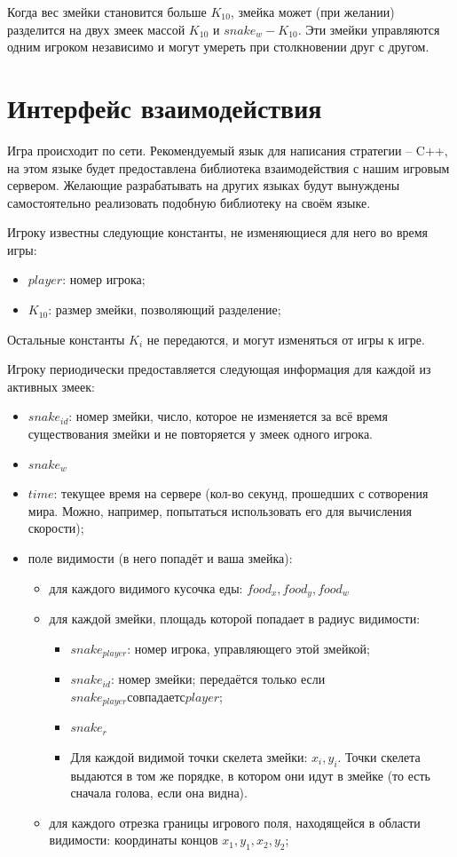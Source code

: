 \documentclass[12pt, a4paper]{article}
\begin{document}
Когда вес змейки становится больше $K_{10}$, змейка может (при желании) разделится на двух змеек массой $K_{10}$ и $snake_w - K_{10}$. Эти змейки управляются одним игроком независимо и могут умереть при столкновении друг с другом.

{\section{Интерфейс взаимодействия}}

Игра происходит по сети. Рекомендуемый язык для написания стратегии -- C++, на этом языке будет предоставлена библиотека взаимодействия с нашим игровым сервером. Желающие разрабатывать на других языках будут вынуждены самостоятельно реализовать подобную библиотеку на своём языке.

Игроку известны следующие константы, не изменяющиеся для него во время игры:
\begin{itemize}
\item $player$: номер игрока;
\item $K_{10}$: размер змейки, позволяющий разделение;
\end{itemize}

Остальные константы $K_i$ не передаются, и могут изменяться от игры к игре.

Игроку периодически предоставляется следующая информация для каждой из активных змеек:
\begin{itemize}
\item $snake_{id}$: номер змейки, число, которое не изменяется за всё время существования змейки и не повторяется у змеек одного игрока.
\item $snake_w$
\item $time$: текущее время на сервере (кол-во секунд, прошедших с сотворения мира. Можно, например, попытаться использовать его для вычисления скорости);
\item поле видимости (в него попадёт и ваша змейка):
\begin{itemize}
\item для каждого видимого кусочка еды: $food_x, food_y, food_w$
\item для каждой змейки, площадь которой попадает в радиус видимости: 
\begin{itemize}
\item $snake_{player}$: номер игрока, управляющего этой змейкой;
\item $snake_{id}$: номер змейки; передаётся только если $snake_{player} совпадает с player$;
\item $snake_r$
\item Для каждой видимой точки скелета змейки: $x_i, y_i$. Точки скелета выдаются в том же порядке, в котором они идут в змейке (то есть сначала голова, если она видна).
\end{itemize}
\item для каждого отрезка границы игрового поля, находящейся в области видимости: координаты концов $x_1, y_1, x_2, y_2$;
\end{itemize}
\end{itemize}
\end{document}
